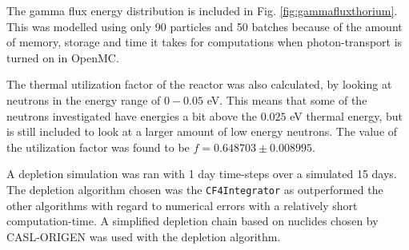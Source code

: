 \documentclass[norsk,a4paper,12pt]{article}
\begin{document}
\begin{multicols}{2}
The gamma flux energy distribution is included in Fig. \ref{fig:gammafluxthorium}. This was modelled using only 90 particles and 50 batches because of the amount of memory, storage and time it takes for computations when photon-transport is turned on in OpenMC.


The thermal utilization factor of the reactor was also calculated, by looking at neutrons in the energy range of $0 - 0.05$ eV. This means that some of the neutrons investigated have energies a bit above the $0.025$ eV thermal energy, but is still included to look at a larger amount of low energy neutrons. The value of the utilization factor was found to be $f = 0.648703 \pm 0.008995$. 


A depletion simulation was ran with 1 day time-steps over a simulated 15 days. The depletion algorithm chosen was the \texttt{CF4Integrator} as outperformed the other algorithms with regard to numerical errors\cite{cf4paper} with a relatively short computation-time. A simplified depletion chain based on nuclides chosen by CASL-ORIGEN\cite{casl} was used with the depletion algorithm.


\end{multicols}
\end{document}
